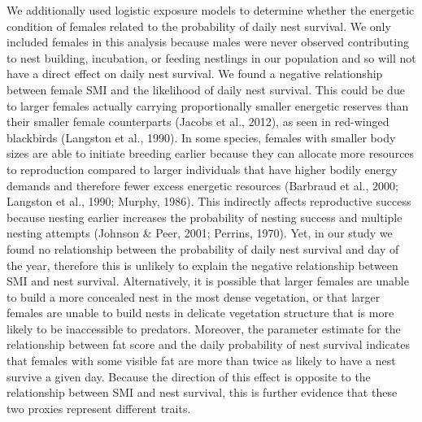 \documentclass[
]{article}
\begin{document}
We additionally used logistic exposure models to determine whether the
energetic condition of females related to the probability of daily nest
survival. We only included females in this analysis because males were
never observed contributing to nest building, incubation, or feeding
nestlings in our population and so will not have a direct effect on
daily nest survival. We found a negative relationship between female SMI
and the likelihood of daily nest survival. This could be due to larger
females actually carrying proportionally smaller energetic reserves than
their smaller female counterparts (Jacobs et al., 2012), as seen in
red-winged blackbirds (Langston et al., 1990). In some species, females
with smaller body sizes are able to initiate breeding earlier because
they can allocate more resources to reproduction compared to larger
individuals that have higher bodily energy demands and therefore fewer
excess energetic resources (Barbraud et al., 2000; Langston et al.,
1990; Murphy, 1986). This indirectly affects reproductive success
because nesting earlier increases the probability of nesting success and
multiple nesting attempts (Johnson \& Peer, 2001; Perrins, 1970). Yet,
in our study we found no relationship between the probability of daily
nest survival and day of the year, therefore this is unlikely to explain
the negative relationship between SMI and nest survival. Alternatively,
it is possible that larger females are unable to build a more concealed
nest in the most dense vegetation, or that larger females are unable to
build nests in delicate vegetation structure that is more likely to be
inaccessible to predators. Moreover, the parameter estimate for the
relationship between fat score and the daily probability of nest
survival indicates that females with some visible fat are more than
twice as likely to have a nest survive a given day. Because the
direction of this effect is opposite to the relationship between SMI and
nest survival, this is further evidence that these two proxies represent
different traits.
\end{document}
